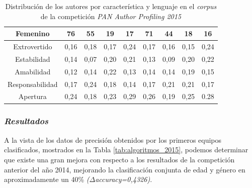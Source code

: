 \begin{table}[H]
{\begin{tabular}{|c|c|c|c|c|c|c|c|c|}
			Femenino                               & 76                                                                & 55                                                       & 19                & 17                & 71              & 44               & 18                & 16                \\ \hline
			\hline
			Extrovertido                           & 0,16                                                              & 0,18                                                     & 0,17              & 0,24              & 0,17            & 0,16             & 0,15              & 0,24              \\ \hline
			Estabilidad                            & 0,14                                                              & 0,07                                                     & 0,20              & 0,21              & 0,13            & 0,09             & 0,20              & 0,22              \\ \hline
			Amabilidad                             & 0,12                                                              & 0,14                                                     & 0,22              & 0,13              & 0,14            & 0,14             & 0,19              & 0,15              \\ \hline
			Responsabilidad                        & 0,17                                                              & 0,24                                                     & 0,18              & 0,14              & 0,17            & 0,21             & 0,21              & 0,17              \\ \hline
			Apertura                               & 0,24                                                              & 0,18                                                     & 0,23              & 0,29              & 0,26            & 0,19             & 0,25              & 0.28              \\ \hline
		\end{tabular}
	}
	\caption{Distribución de los autores por característica y lenguaje en el \textit{corpus} de la competición \textit{PAN Author Profiling 2015}}
	\label{tab:dataset_2015}
\end{table}

\subsubsection{\textit{Resultados}}

A la vista de los datos de precisión obtenidos por los primeros equipos clasificados, mostrados en la Tabla \ref{tab:algoritmos_2015},
podemos determinar que existe una gran mejora con respecto a los resultados de la competición anterior del año 2014, mejorando
la clasificación conjunta de edad y género en aproximadamente un 40\% \textit{($\Delta$accuracy=0,4326)}.

